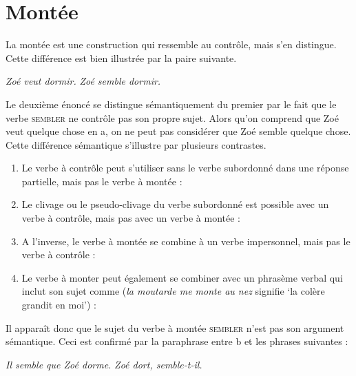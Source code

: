 \section{Montée}
\label{sec:13-montee}
La montée est une construction qui ressemble au contrôle, mais s’en distingue. Cette différence est bien illustrée par la paire suivante.

\ea\label{ex:13-dormir}
\ea \textit{Zoé veut dormir.}
\ex \textit{Zoé semble dormir.}\z\z

Le deuxième énoncé se distingue sémantiquement du premier par le fait que le verbe \textsc{sembler} ne contrôle pas son propre sujet. Alors qu’on comprend que Zoé veut quelque chose en a, on ne peut pas considérer que Zoé semble quelque chose. Cette différence sémantique s’illustre par plusieurs contrastes.

\begin{enumerate}[label=(\arabic*)]
\item	Le verbe à contrôle peut s’utiliser sans le verbe subordonné dans une réponse partielle, mais pas le verbe à montée :
\ea{}
\z\z

\item	Le clivage ou le pseudo-clivage du verbe subordonné est possible avec un verbe à contrôle, mais pas avec un verbe à montée :
\ea{}
\z\z

\item	A l’inverse, le verbe à montée se combine à un verbe impersonnel, mais pas le verbe à contrôle :
\ea{}
\z\z

\item	Le verbe à monter peut également se combiner avec un phrasème verbal qui inclut son sujet comme  (\textit{la moutarde me monte au nez} signifie ‘la colère grandit en moi’) :
\ea{}
\z\z

\end{enumerate}

Il apparaît donc que le sujet du verbe à montée \textsc{sembler} n’est pas son argument sémantique. Ceci est confirmé par la paraphrase entre b et les phrases suivantes :

\ea\ea \textit{Il semble que Zoé dorme.}
\ex \textit{Zoé dort, semble-t-il.}\z\z

